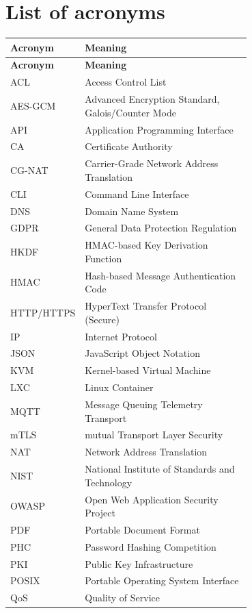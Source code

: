 \chapter*{List of acronyms}

\begin{longtable}{@{}l p{0.7\linewidth}@{}}
\hline
\textbf{Acronym} & \textbf{Meaning} \\
\hline
\endfirsthead
\hline
\textbf{Acronym} & \textbf{Meaning} \\
\hline
\endhead
\hline
\endfoot
\hline
\endlastfoot
ACL & Access Control List \\
AES-GCM & Advanced Encryption Standard, Galois/Counter Mode \\
API & Application Programming Interface \\
CA & Certificate Authority \\
CG-NAT & Carrier-Grade Network Address Translation \\
CLI & Command Line Interface \\
DNS & Domain Name System \\
GDPR & General Data Protection Regulation \\
HKDF & HMAC-based Key Derivation Function \\
HMAC & Hash-based Message Authentication Code \\
HTTP/HTTPS & HyperText Transfer Protocol (Secure) \\
IP & Internet Protocol \\
JSON & JavaScript Object Notation \\
KVM & Kernel-based Virtual Machine \\
LXC & Linux Container \\
MQTT & Message Queuing Telemetry Transport \\
mTLS & mutual Transport Layer Security \\
NAT & Network Address Translation \\
NIST & National Institute of Standards and Technology \\
OWASP & Open Web Application Security Project \\
PDF & Portable Document Format \\
PHC & Password Hashing Competition \\
PKI & Public Key Infrastructure \\
POSIX & Portable Operating System Interface \\
QoS & Quality of Service \\

\end{longtable}
